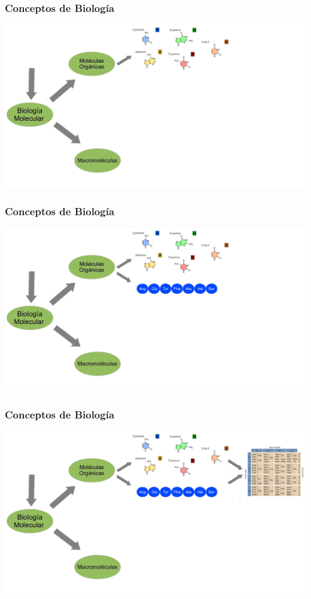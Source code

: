     \begin{frame}\frametitle{\textbf{Conceptos de Biología}}
        \begin{center}
          \includegraphics[scale=.2]{images/biologia3.png}
        \end{center}
    \end{frame}
    
    \begin{frame}\frametitle{\textbf{Conceptos de Biología}}
        \begin{center}
          \includegraphics[scale=.2]{images/biologia4.png}
        \end{center}
    \end{frame}

    \begin{frame}\frametitle{\textbf{Conceptos de Biología}}
        \begin{center}
          \includegraphics[scale=.2]{images/biologia5.png}
        \end{center}
    \end{frame}

